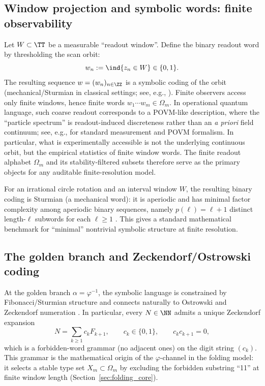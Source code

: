 \subsection{Window projection and symbolic words: finite observability}
\label{subsec:window_projection}

Let $W\subset\TT$ be a measurable ``readout window''.
Define the binary readout word by thresholding the scan orbit:
\begin{equation}\label{eq:window_word}
w_n:=\ind\{z_n\in W\}\in\{0,1\}.
\end{equation}
The resulting sequence $w=(w_n)_{n\in\ZZ}$ is a symbolic coding of the orbit (mechanical/Sturmian in classical settings; see, e.g., \cite{Lothaire2002,LindMarcus1995}).
Finite observers access only finite windows, hence finite words $w_1\cdots w_m\in\Omega_m$.
In operational quantum language, such coarse readout corresponds to a POVM-like description, where the ``particle spectrum'' is readout-induced discreteness rather than an \emph{a priori} field continuum; see, e.g., \cite{NielsenChuang2010} for standard measurement and POVM formalism.
In particular, what is experimentally accessible is not the underlying continuous orbit, but the empirical statistics of finite window words.
The finite readout alphabet $\Omega_m$ and its stability-filtered subsets therefore serve as the primary objects for any auditable finite-resolution model.

\begin{remark}\label{rem:sturmian_minimal_complexity}
For an irrational circle rotation and an interval window $W$, the resulting binary coding is Sturmian (a mechanical word): it is aperiodic and has minimal factor complexity among aperiodic binary sequences, namely $p(\ell)=\ell+1$ distinct length-$\ell$ subwords for each $\ell\ge 1$ \cite{Lothaire2002,AlloucheShallit2003,LindMarcus1995}.
This gives a standard mathematical benchmark for ``minimal'' nontrivial symbolic structure at finite resolution.
\end{remark}

\subsection{The golden branch and Zeckendorf/Ostrowski coding}
\label{subsec:zeckendorf_coding}

At the golden branch $\alpha=\varphi^{-1}$, the symbolic language is constrained by Fibonacci/Sturmian structure and connects naturally to Ostrowski and Zeckendorf numeration \cite{Zeckendorf1972,AlloucheShallit2003,Lothaire2002}.
In particular, every $N\in\NN$ admits a unique Zeckendorf expansion
\begin{equation}\label{eq:zeckendorf}
N=\sum_{k\ge 1} c_k F_{k+1},
\qquad c_k\in\{0,1\},\qquad c_kc_{k+1}=0,
\end{equation}
which is a forbidden-word grammar (no adjacent ones) on the digit string $(c_k)$.
This grammar is the mathematical origin of the $\varphi$-channel in the folding model: it selects a stable type set $X_m\subset\Omega_m$ by excluding the forbidden substring ``11'' at finite window length (Section~\ref{sec:folding_core}).

